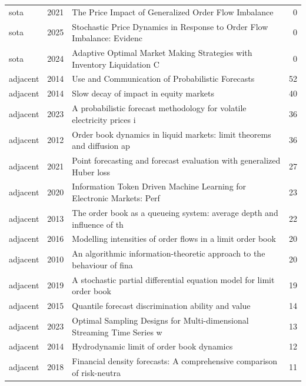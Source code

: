 \begin{longtable}{llp{9.2cm}r}
sota & 2021 & The Price Impact of Generalized Order Flow Imbalance~\citep{su2021price} & 0 \\
sota & 2025 & Stochastic Price Dynamics in Response to Order Flow Imbalance: Evidenc~\citep{hu2025stochastic} & 0 \\
sota & 2024 & Adaptive Optimal Market Making Strategies with Inventory Liquidation C~\citep{chavezcasillas2024adaptive} & 0 \\
adjacent & 2014 & Use and Communication of Probabilistic Forecasts~\citep{raftery2014use} & 52 \\
adjacent & 2014 & Slow decay of impact in equity markets~\citep{brokmann2014slow} & 40 \\
adjacent & 2023 & A probabilistic forecast methodology for volatile electricity prices i~\citep{cornell2023probabilistic} & 36 \\
adjacent & 2012 & Order book dynamics in liquid markets: limit theorems and diffusion ap~\citep{cont2012order} & 36 \\
adjacent & 2021 & Point forecasting and forecast evaluation with generalized Huber loss~\citep{taggart2021point} & 27 \\
adjacent & 2020 & Information Token Driven Machine Learning for Electronic Markets: Perf~\citep{samuel2020information} & 23 \\
adjacent & 2013 & The order book as a queueing system: average depth and influence of th~\citep{toke2013order} & 22 \\
adjacent & 2016 & Modelling intensities of order flows in a limit order book~\citep{toke2016modelling} & 20 \\
adjacent & 2010 & An algorithmic information-theoretic approach to the behaviour of fina~\citep{zenil2010algorithmic} & 20 \\
adjacent & 2019 & A stochastic partial differential equation model for limit order book ~\citep{cont2019stochastic} & 19 \\
adjacent & 2015 & Quantile forecast discrimination ability and value~\citep{bouallegue2015quantile} & 14 \\
adjacent & 2023 & Optimal Sampling Designs for Multi-dimensional Streaming Time Series w~\citep{xie2023optimal} & 13 \\
adjacent & 2014 & Hydrodynamic limit of order book dynamics~\citep{gao2014hydrodynamic} & 12 \\
adjacent & 2018 & Financial density forecasts: A comprehensive comparison of risk-neutra~\citep{crisostomo2018financial} & 11 \\

\end{longtable}
